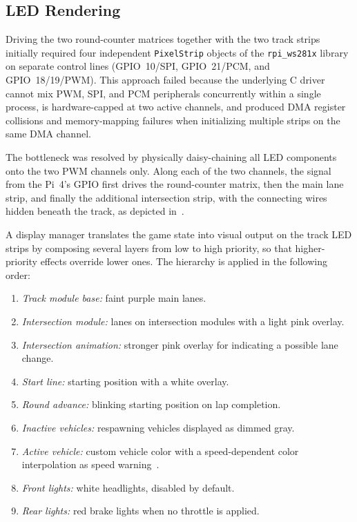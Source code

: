 \documentclass[10pt,journal,final,a4paper]{IEEEtran}
\begin{document}
\subsection{LED Rendering}
\label{subsec:led-rendering}

Driving the two round-counter matrices together with the two track strips initially required four independent \texttt{PixelStrip} objects of the \texttt{rpi\_ws281x} library on separate control lines (GPIO~10/SPI, GPIO~21/PCM, and GPIO~18/19/PWM). This approach failed because the underlying C driver~\cite{garff:2023rpi} cannot mix PWM, SPI, and PCM peripherals concurrently within a single process, is hardware-capped at two active channels, and produced DMA register collisions and memory-mapping failures when initializing multiple strips on the same DMA channel.

The bottleneck was resolved by physically daisy-chaining all LED components onto the two PWM channels only. Along each of the two channels, the signal from the Pi~4's GPIO first drives the round-counter matrix, then the main lane strip, and finally the additional intersection strip, with the connecting wires hidden beneath the track, as depicted in~.


A display manager translates the game state into visual output on the track LED strips by composing several layers from low to high priority, so that higher-priority effects override lower ones. The hierarchy is applied in the following order:

\begin{enumerate}
    \item \textit{Track module base:} faint purple main lanes.
    \item \textit{Intersection module:} lanes on intersection modules with a light pink overlay.
    \item \textit{Intersection animation:} stronger pink overlay for indicating a possible lane change.
    \item \textit{Start line:} starting position with a white overlay.
    \item \textit{Round advance:} blinking starting position on lap completion.
    \item \textit{Inactive vehicles:} respawning vehicles displayed as dimmed gray.
    \item \textit{Active vehicle:} custom vehicle color with a speed-dependent color interpolation as speed warning~\cite{meschtscherjakov:2015chaselight}.
    \item \textit{Front lights:} white headlights, disabled by default.
    \item \textit{Rear lights:} red brake lights when no throttle is applied.
\end{enumerate}
\end{document}
